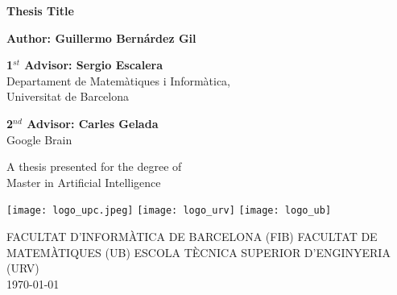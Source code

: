 

\begin{titlepage}
\begin{center}
\vspace*{1cm}
\Huge{\textbf{Thesis Title}}


\vspace{1.5cm}

\Large
\textbf{Author: Guillermo Bernárdez Gil}
\end{center}

\vspace{10mm}
\textbf{1$^{st}$ Advisor: Sergio Escalera}\\
\indent Departament de Matemàtiques i Informàtica, \\ 
\indent Universitat de Barcelona

\vspace{8mm}
\textbf{2$^{nd}$ Advisor: Carles Gelada}\\
\indent Google Brain\\

\vfill

\begin{center}
\LARGE
A thesis presented for the degree of\\
Master in Artificial Intelligence

\vspace{1.8cm}
 
\texttt{[image: logo\_upc.jpeg]}
\texttt{[image: logo\_urv]}
\texttt{[image: logo\_ub]}

\Large
FACULTAT D’INFORMÀTICA DE BARCELONA (FIB)
FACULTAT DE MATEMÀTIQUES (UB)
ESCOLA TÈCNICA SUPERIOR D’ENGINYERIA (URV)\\
\today
 
\end{center}
\end{titlepage}
	
